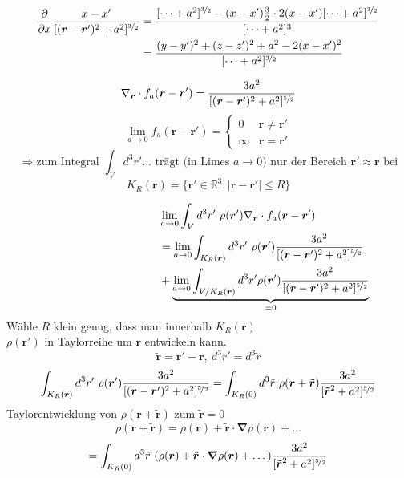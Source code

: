 \documentclass[titlepage,11pt,a4paper,ngerman]{report}
\newcommand{\prt}[2]{\frac{\partial #1}{\partial #2}}
\renewcommand{\vec}[1]{\boldsymbol{#1}}
\newcommand{\vabla}{\boldsymbol{\nabla}}
\begin{document}
\begin{align*}
\prt{}{x} \frac{x-x'}{[(\vec{r}-\vec{r}')^2 + a^2]^{\nicefrac{3}{2}}} &= \frac{[\dots +a^2]^{\nicefrac{3}{2}} - (x - x') \frac{3}{2} \cdot 2(x-x') [\dots + a^2]^{\nicefrac{3}{2}}}{[\dots + a^2]^3}\\
&= \frac{(y - y')^2 + (z - z')^2 + a^2 - 2(x - x')^2}{[\dots + a^2]^{\nicefrac{3}{2}}}
\end{align*}

$$\nabla_{\vec{r}} \cdot f_a(\vec{r}-\vec{r}') = \frac{3a^2}{[(\vec{r}-\vec{r}')^2 + a^2]^{\nicefrac{5}{2}}}$$
$$\lim_{a \to 0} f_a(\vec{r}-\vec{r}') = \left\{ \begin{array}{cc}
0 & \vec{r} \neq \vec{r}'\\
\infty & \vec{r} = \vec{r}'	
\end{array} \right.$$
$$\Rightarrow \textrm{zum Integral } \int_V d^3r' \dots \textrm{ trägt (in Limes }a \to 0) \textrm{ nur der Bereich } \vec{r}' \approx \vec{r} \textrm{ bei}$$
$$K_R (\vec{r}) = \{\vec{r}' \in \mathbb R^3: |\vec{r} - \vec{r}'| \leq R\}$$







\begin{align*}
 	\hspace{100pt} &\lim_{a \to 0} \int_V d^3 r'\ \rho(\vec{r}') \nabla_{\vec{r}} \cdot f_a(\vec{r}- \vec{r}')\\
	&= \lim_{a \to 0} \int_{K_R (\vec{r})} d^3 r' \ \rho(\vec{r}') \frac{3a^2}{[(\vec{r}-\vec{r}')^2 + a^2]^{\nicefrac{5}{2}}}\\
 	&+ \underbrace{\lim_{a \to 0} \int_{V / K_R (\vec{r})} d^3 r' \rho(\vec{r}') \frac{3a^2}{[(\vec{r}-\vec{r}')^2 + a^2]^{\nicefrac{5}{2}}}}_{= 0}
\end{align*}
Wähle $R$ klein genug, dass man innerhalb $K_R (\vec{r})$\\
$\rho(\vec{r}')$ in Taylorreihe um $\vec{r}$ entwickeln kann.
$$\vec{\tilde{r}} = \vec{r}' - \vec{r},\ d^3 r' = d^3 \tilde{r}$$
$$\int_{K_R (\vec{r})} d^3 r' \ \rho(\vec{r}') \frac{3a^2}{[(\vec{r}-\vec{r}')^2 + a^2]^{\nicefrac{5}{2}}} = \int_{K_R (0)} d^3 \tilde{r} \ \rho(\vec{r} + \vec{\tilde{r}}) \frac{3a^2}{[\vec{\tilde{r}}^2 + a^2]^{\nicefrac{5}{2}}}$$
Taylorentwicklung von $\rho(\vec{r} + \vec{\tilde{r}})$ zum $\vec{\tilde{r}} = 0$
$$\rho(\vec{r} + \vec{\tilde{r}}) = \rho(\vec{r}) + \vec{\tilde{r}} \cdot \vabla \rho(\vec{r}) + \dots$$
$$= \int_{K_R (0)} d^3 \tilde{r} \ (\rho(\vec{r}) + \vec{\tilde{r}} \cdot \vabla \rho(\vec{r}) + \dots) \frac{3a^2}{[\vec{\tilde{r}}^2 + a^2]^{\nicefrac{5}{2}}}$$
\end{document}
